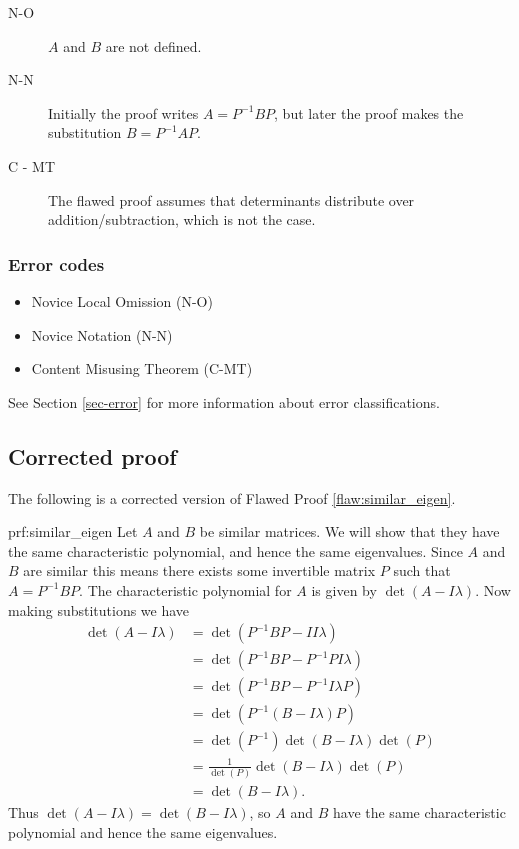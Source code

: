  \begin{description}
    \item[N-O] $A$ and $B$ are not defined.
    \item[N-N] Initially the proof writes $A = P^{-1}BP$, but later the proof makes the substitution $B = P^{-1}AP$.
    \item[C - MT] The flawed proof assumes that determinants distribute over addition/subtraction, which is not the case.
 \end{description}


\subsubsection{Error codes}
\begin{itemize}
	\item Novice Local Omission (N-O)
\item Novice Notation (N-N)
\item Content Misusing Theorem (C-MT)
\end{itemize}
See Section \ref{sec-error} for more information about error classifications.

\clearpage
\subsection{Corrected proof}

The following is a corrected version of Flawed Proof \ref{flaw:similar_eigen}. %

\begin{prf}{prf:similar_eigen} %
Let $A$ and $B$ be similar matrices. We will show that they have the same characteristic polynomial, and hence the same eigenvalues. Since $A$ and $B$ are similar this means there exists some invertible matrix $P$ such that $A = P^{-1}BP$. The characteristic polynomial for $A$ is given by $\det(A - I\lambda)$. Now making substitutions we have
\begin{align*}
    \det(A - I\lambda) &= \det(P^{-1}BP - II\lambda)\\
    &= \det(P^{-1}BP - P^{-1}PI\lambda)\\
    &= \det(P^{-1}BP - P^{-1}I\lambda P)\\
    &= \det(P^{-1}(B - I\lambda)P) \\
    &= \det(P^{-1})\det(B - I\lambda)\det(P) \\
    &= \frac{1}{\det(P)}\det(B - I\lambda)\det(P) \\
    &= \det(B - I\lambda).
\end{align*}
Thus $\det(A - I\lambda) = \det(B - I\lambda)$, so $A$ and $B$ have the same characteristic polynomial and hence the same eigenvalues.
\end{prf} 
